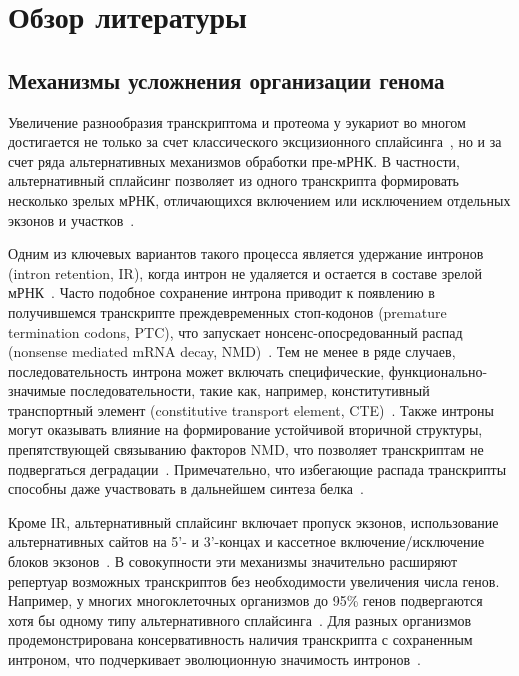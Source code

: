 \clearpage
\section{Обзор литературы}

\subsection{Механизмы усложнения организации генома}

Увеличение разнообразия транскриптома и протеома у эукариот во многом достигается не только за счет классического эксцизионного сплайсинга~\cite{Jurica2013}, но и за счет ряда альтернативных механизмов обработки пре-мРНК.
В частности, альтернативный сплайсинг позволяет из одного транскрипта формировать несколько зрелых мРНК, отличающихся включением или исключением отдельных экзонов и участков~\cite{Krebs2017}.

Одним из ключевых вариантов такого процесса является удержание интронов (intron retention, IR), когда интрон не удаляется и остается в составе зрелой мРНК~\cite{Schmitz2017}.
Часто подобное сохранение интрона приводит к появлению в получившемся транскрипте преждевременных стоп-кодонов (premature termination codons, PTC), что запускает нонсенс-опосредованный распад (nonsense mediated mRNA decay, NMD)~\cite{Kalyna2012}.
Тем не менее в ряде случаев, последовательность интрона может включать специфические, функционально-значимые последовательности, такие как, например, конститутивный транспортный элемент (constitutive transport element, CTE)~\cite{Zolotukhin2001}.
Также интроны могут оказывать влияние на формирование устойчивой вторичной структуры, препятствующей связыванию факторов NMD, что позволяет транскриптам не подвергаться деградации~\cite{Mamon2013}.
Примечательно, что избегающие распада транскрипты способны даже участвовать в дальнейшем синтеза белка~\cite{Mamon2019}.

Кроме IR, альтернативный сплайсинг включает пропуск экзонов, использование альтернативных сайтов на 5'- и 3'-концах и кассетное включение/исключение блоков экзонов~\cite{Kalyna2012}.
В совокупности эти механизмы значительно расширяют репертуар возможных транскриптов без необходимости увеличения числа генов.
Например, у многих многоклеточных организмов до 95\% генов подвергаются хотя бы одному типу альтернативного сплайсинга~\cite{Mamon2019}.
Для разных организмов продемонстрирована консервативность наличия транскрипта с сохраненным интроном, что подчеркивает эволюционную значимость интронов~\cite{Mamon2013}.

